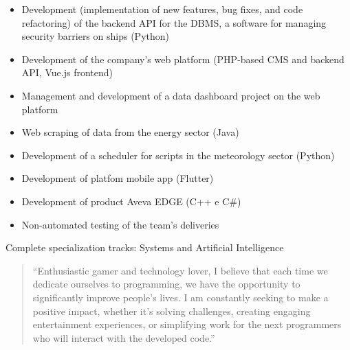 \documentclass[10pt,a4paper,ragged2e,withhyper]{altacv}
\begin{document}
\begin{paracol}{2}

\begin{itemize}
\item Development (implementation of new features, bug fixes, and code refactoring) of the backend API for the DBMS, a software for managing security barriers on ships (Python)
\end{itemize}

\divider

\begin{itemize}
\item Development of the company's web platform (PHP-based CMS and backend API, Vue.js frontend)
\item Management and development of a data dashboard project on the web platform
\item Web scraping of data from the energy sector (Java)
\item Development of a scheduler for scripts in the meteorology sector (Python)
\item Development of platfom mobile app (Flutter)
\end{itemize}

\divider

\begin{itemize}
\item Development of product Aveva EDGE (C++ e C\#)
\item Non-automated testing of the team's deliveries
\end{itemize}



\divider

Complete specialization tracks: Systems and Artificial Intelligence 

\switchcolumn


\begin{quote}
``Enthusiastic gamer and technology lover, I believe that each time we dedicate ourselves to programming, we have the opportunity to significantly improve people's lives. I am constantly seeking to make a positive impact, whether it's solving challenges, creating engaging entertainment experiences, or simplifying work for the next programmers who will interact with the developed code.''
\end{quote}


\end{paracol}
\end{document}
